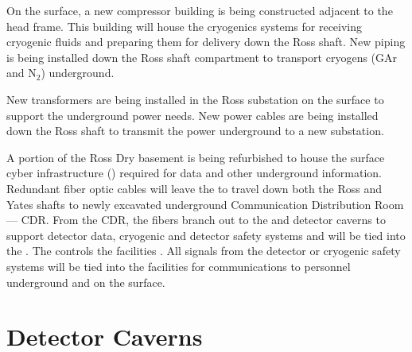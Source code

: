 On the surface, a new compressor building is being constructed
adjacent to the head frame.  This building will house the cryogenics
systems for receiving cryogenic fluids and preparing them for delivery
down the Ross shaft.  New piping is being installed down the Ross
shaft compartment to transport cryogens (GAr and N$_2$) underground.

New transformers are being installed in the Ross substation on the
surface to support the underground power needs.  New power cables are
being installed down the Ross shaft to transmit the power underground
to a new substation.

A portion of the Ross Dry basement is being refurbished to house the
surface cyber infrastructure ()
required for data and other underground information.  Redundant fiber
optic cables will leave the  to travel down both the Ross and Yates
shafts to newly excavated underground Communication Distribution Room
--- CDR.  From the CDR, the fibers branch out to the  and detector
caverns to support detector data, cryogenic and detector safety
systems and will be tied into the .
The  controls the facilities .
All  signals from the detector or cryogenic safety systems will be
tied into the facilities  for communications to personnel
underground and on the surface.

\section{Detector Caverns}
\label{sec:fdsp-coord-faci-caverns}


